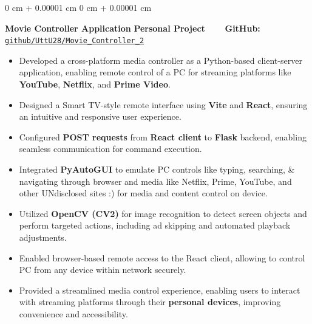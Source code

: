 \documentclass[10pt, letterpaper]{article}
\newenvironment{highlights}{
    \begin{itemize}[
        topsep=0.10 cm,
        parsep=0.10 cm,
        partopsep=0pt,
        itemsep=0pt,
        leftmargin=0 cm + 10pt
    ]
}{
    \end{itemize}
} %
\newenvironment{onecolentry}{
    \begin{adjustwidth}{
        0 cm + 0.00001 cm
    }{
        0 cm + 0.00001 cm
    }
}{
    \end{adjustwidth}
} %
\begin{document}
\vspace{0.15 cm}

\begin{onecolentry}
	\textbf{Movie Controller Application} \hfill \textbf{Personal Project} \ \ \ \ \textbf{GitHub:} \href{https://github.com/UttU28/Movie_Controller_2}{\texttt{github/UttU28/Movie\_Controller\_2}}
	\begin{highlights}
		\item Developed a cross-platform media controller as a Python-based client-server application, enabling remote control of a PC for streaming platforms like \textbf{YouTube}, \textbf{Netflix}, and \textbf{Prime Video}.
		\item Designed a Smart TV-style remote interface using \textbf{Vite} and \textbf{React}, ensuring an intuitive and responsive user experience.
		\item Configured \textbf{POST requests} from \textbf{React client} to \textbf{Flask} backend, enabling seamless communication for command execution.
		\item Integrated \textbf{PyAutoGUI} to emulate PC controls like typing, searching, \& navigating through browser and media like Netflix, Prime, YouTube, and other UNdisclosed sites :) for media and content control on device.
		\item Utilized \textbf{OpenCV (CV2)} for image recognition to detect screen objects and perform targeted actions, including ad skipping and automated playback adjustments.
		\item Enabled browser-based remote access to the React client, allowing to control PC from any device within network securely.
		\item Provided a streamlined media control experience, enabling users to interact with streaming platforms through their \textbf{personal devices}, improving convenience and accessibility.
	\end{highlights}
\end{onecolentry}
\end{document}
